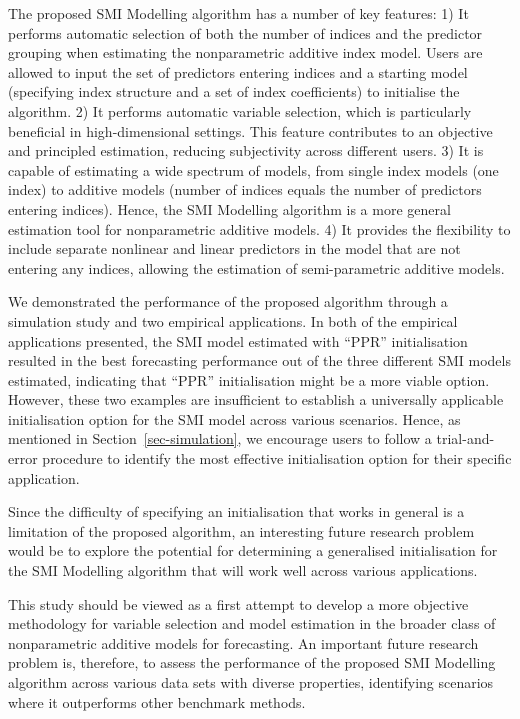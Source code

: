 \documentclass[
  11pt,
  a4paper,
]{report}
\begin{document}
The proposed SMI Modelling algorithm has a number of key features: 1) It
performs automatic selection of both the number of indices and the
predictor grouping when estimating the nonparametric additive index
model. Users are allowed to input the set of predictors entering indices
and a starting model (specifying index structure and a set of index
coefficients) to initialise the algorithm. 2) It performs automatic
variable selection, which is particularly beneficial in high-dimensional
settings. This feature contributes to an objective and principled
estimation, reducing subjectivity across different users. 3) It is
capable of estimating a wide spectrum of models, from single index
models (one index) to additive models (number of indices equals the
number of predictors entering indices). Hence, the SMI Modelling
algorithm is a more general estimation tool for nonparametric additive
models. 4) It provides the flexibility to include separate nonlinear and
linear predictors in the model that are not entering any indices,
allowing the estimation of semi-parametric additive models.

We demonstrated the performance of the proposed algorithm through a
simulation study and two empirical applications. In both of the
empirical applications presented, the SMI model estimated with ``PPR''
initialisation resulted in the best forecasting performance out of the
three different SMI models estimated, indicating that ``PPR''
initialisation might be a more viable option. However, these two
examples are insufficient to establish a universally applicable
initialisation option for the SMI model across various scenarios. Hence,
as mentioned in Section~\ref{sec-simulation}, we encourage users to
follow a trial-and-error procedure to identify the most effective
initialisation option for their specific application.

Since the difficulty of specifying an initialisation that works in
general is a limitation of the proposed algorithm, an interesting future
research problem would be to explore the potential for determining a
generalised initialisation for the SMI Modelling algorithm that will
work well across various applications.

This study should be viewed as a first attempt to develop a more
objective methodology for variable selection and model estimation in the
broader class of nonparametric additive models for forecasting. An
important future research problem is, therefore, to assess the
performance of the proposed SMI Modelling algorithm across various data
sets with diverse properties, identifying scenarios where it outperforms
other benchmark methods.
\end{document}
